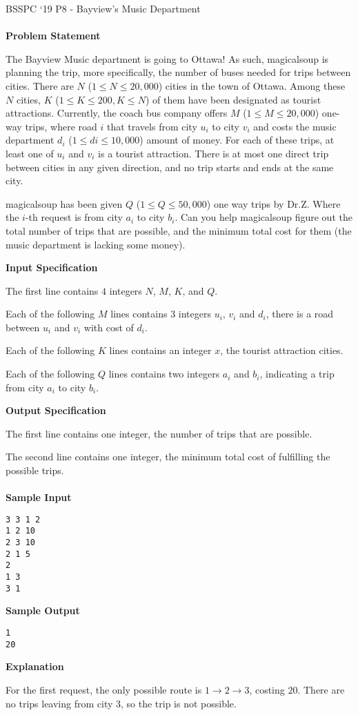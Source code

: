 \documentclass[]{article}
\begin{document}
{\Large BSSPC ‘19 P8 - Bayview's Music Department}
\\\\
\textbf{\large Problem Statement}
\par
The Bayview Music department is going to Ottawa! As such, magicalsoup is planning the trip, more specifically, the number of buses needed for trips between cities. There are $N$ ($1 \le N \le 20,000$) cities in the town of Ottawa. Among these $N$ cities, $K$ ($1 \le K \le 200,K \le N$) of them have been designated as tourist attractions. Currently, the coach bus company offers $M$ ($1 \le M \le 20,000$) one-way trips, where road $i$ that travels from city $u_i$ to city $v_i$ and costs the music department $d_i$ ($1 \le di \le 10,000$) amount of money. For each of these trips, at least one of $u_i$ and $v_i$ is a tourist attraction. There is at most one direct trip between cities in any given direction, and no trip starts and ends at the same city.

magicalsoup has been given $Q$ ($1 \le Q \le 50,000$) one way trips by Dr.Z. Where the $i$-th request is from city $a_i$ to city $b_i$. Can you help magicalsoup figure out the total number of trips that are possible, and the minimum total cost for them (the music department is lacking some money).

\textbf{\large Input Specification}
\par
The first line contains $4$ integers $N$, $M$, $K$, and $Q$.

Each of the following $M$ lines contains $3$ integers $u_i$, $v_i$ and $d_i$, there is a road between $u_i$ and $v_i$ with cost of $d_i$.

Each of the following $K$ lines contains an integer $x$, the tourist attraction cities.

Each of the following $Q$ lines contains two integers $a_i$ and $b_i$, indicating a trip from city $a_i$ to city $b_i$.

\textbf{\large Output Specification}
\par
The first line contains one integer, the number of trips that are possible.

\par
The second line contains one integer, the minimum total cost of fulfilling the possible trips.
\\\\
\textbf{\large Sample Input}
\begin{verbatim}
3 3 1 2
1 2 10
2 3 10
2 1 5
2
1 3
3 1
\end{verbatim}
\textbf{\large Sample Output}
\begin{verbatim}
1
20
\end{verbatim}
\textbf{\large Explanation}
\par
For the first request, the only possible route is $1 \rightarrow 2 \rightarrow 3$, costing $20$. There are no trips leaving from city $3$, so the trip is not possible.

\thispagestyle{empty}
\end{document}
